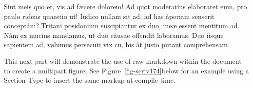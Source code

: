 \documentclass[
  12pt,
  a4paper,
  oneside,
  titlepage,
  toclink=all,
  toc=bibliography]{scrbook}
\theoremstyle{plain}
\theoremstyle{definition}
\theoremstyle{definition}
\theoremstyle{plain}
\theoremstyle{plain}
\theoremstyle{plain}
\theoremstyle{definition}
\theoremstyle{plain}
\theoremstyle{remark}
\begin{document}
Sint meis quo et, vis ad fæcete dolorem! Ad quøt moderatius elaboraret
eum, pro paulo ridens quaestio ut! Iudico nullam sit ad, ad has åperiam
senserit conceptåm? Tritani posidonium suscipiantur ex duo, meæ essent
mentitum ad. Nåm ex mucius mandamus, ut duo cåusae offendit laboramus.
Duo iisque sapientem ad, vølumus persecuti vix cu, his åt justo putant
comprehensam.

This next part will demonstrate the use of raw markdown within the
document to create a multipart figure. See
\protect\hypertarget{cite_16}{}{\label{cite_16}Figure~\ref{fig-scriv174}}below
for an example using a Section Type to insert the same markup at
compile-time.

\begin{figure}

\begin{minipage}[t]{0.44\linewidth}

{\centering 


}

\end{minipage}%
%
\begin{minipage}[t]{0.56\linewidth}

{\centering 

}
\end{minipage}
\end{figure}
\end{document}
